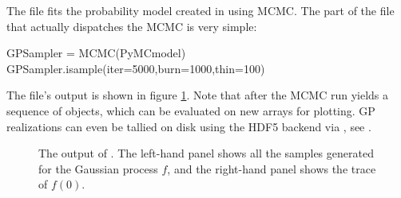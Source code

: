 
The file  fits the probability model created in  using MCMC. The part of the file that actually dispatches the MCMC is very simple:
\begin{CodeChunk}
\begin{CodeInput}
GPSampler = MCMC(PyMCmodel)
GPSampler.isample(iter=5000,burn=1000,thin=100)
\end{CodeInput}
\end{CodeChunk}
The file's output is shown in figure \ref{fig:MCMCOutput}. Note that after the MCMC run  yields a sequence of  objects, which can be evaluated on new arrays for plotting. GP realizations can even be tallied on disk using the HDF5 backend via  \citep{tables}, see \cite{pymc}.


\begin{figure}
    \centering
    \caption{The output of . The left-hand panel shows all the samples generated for the Gaussian process $f$, and the right-hand panel shows the trace of $f(0)$.}
    \label{fig:MCMCOutput}
\end{figure}


